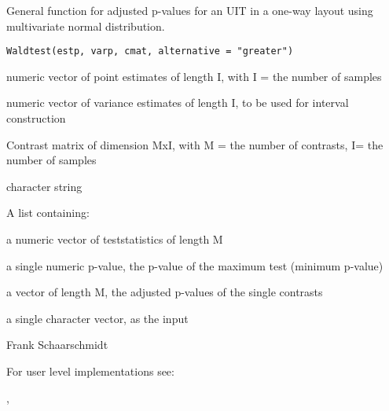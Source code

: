 \begin{Description}\relax
General function for adjusted p-values for an UIT in a one-way layout using multivariate normal distribution.
\end{Description}
\begin{Usage}
\begin{verbatim}
Waldtest(estp, varp, cmat, alternative = "greater")
\end{verbatim}
\end{Usage}
\begin{Arguments}
\begin{ldescription}
\item[\code{estp}] numeric vector of point estimates of length I, with I = the number of samples
\item[\code{varp}] numeric vector of variance estimates of length I, to be used for interval construction 
\item[\code{cmat}] Contrast matrix of dimension MxI, with M = the number of contrasts, I= the number of samples 
\item[\code{alternative}] character string 
\end{ldescription}
\end{Arguments}
\begin{Details}\relax
\end{Details}
\begin{Value}
A list containing:
\begin{ldescription}
\item[\code{teststat}] a numeric vector of teststatistics of length M
\item[\code{pval}] a single numeric p-value, the p-value of the maximum test (minimum p-value)
\item[\code{p.val.adj}] a vector of length M, the adjusted p-values of the single contrasts
\item[\code{alternative}] a single character vector, as the input
\end{ldescription}
\end{Value}
\begin{Author}\relax
Frank Schaarschmidt
\end{Author}
\begin{SeeAlso}\relax
For user level implementations see:

,
\end{SeeAlso}

